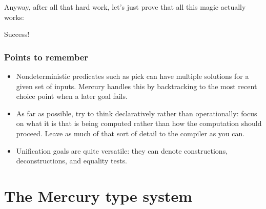 \documentclass[a4paper,11pt,notitlepage,onecolumn]{book}
\begin{document}
Anyway, after all that hard work, let's just prove that all this magic
actually works:
\begin{small}

\begin{ptabular}
\nextline
{}
\nextline
{}
\nextline
{}
\nextline
{}
\nextline
{}
\nextline
{}
\nextline
{}
\nextline
\end{ptabular}

\end{small}
Success!

\subsection*{Points to remember}

\begin{itemize}
\item Nondeterministic predicates such as \textsf{pick} can have multiple solutions
for a given set of inputs.  Mercury handles this by backtracking to the most
recent choice point when a later goal fails.
\item As far as possible, try to think declaratively rather than
operationally: focus on what it is that is being computed rather than how
the computation should proceed.  Leave as much of that sort of detail to the
compiler as you can.
\item Unification goals are quite versatile: they can denote constructions,
deconstructions, and equality tests.
\end{itemize}
\setcounter{chapter}{1}



\chapter{The Mercury type system}
\end{document}
